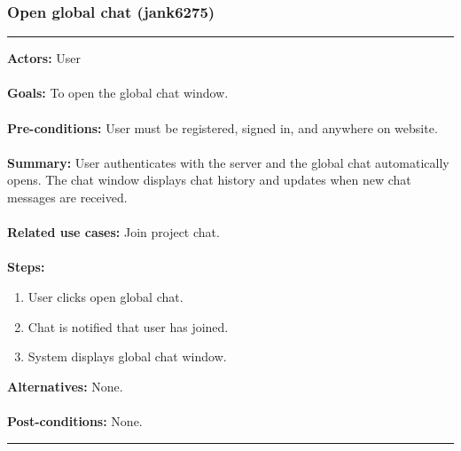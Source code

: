 \documentclass[11pt]{report}
\begin{document}
\subsubsection{Open global chat (jank6275)}
\vspace{2pt}
\hrule
\vspace{8pt}
 \textbf{Actors:} User \\ \\
\textbf{Goals:} To open the global chat window. \\ \\
 \textbf{Pre-conditions:} User must be registered, signed in, and anywhere on website.  \\ \\
 \textbf{Summary:} User authenticates with the server and the global chat automatically opens. The chat window displays chat history and updates when new chat messages are received.  \\ \\
\textbf{Related use cases:} Join project chat. \\ \\
\textbf{Steps:} \begin{enumerate}
  \item User clicks open global chat.
  \item Chat is notified that user has joined.
  \item System displays global chat window.
 \end{enumerate}
 \textbf{Alternatives:} None. \\ \\
 \textbf{Post-conditions:} None. \\
\vspace{8pt}
\hrule
\newpage
\end{document}

